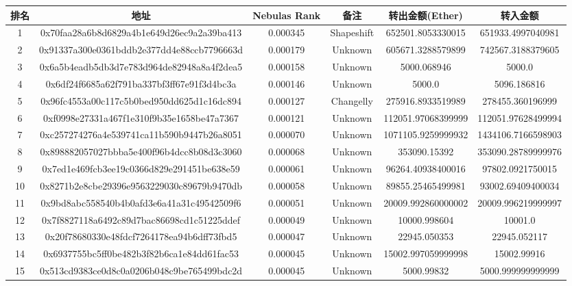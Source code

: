 \begin{table}\label{table:nr}
\begin{tabular}{cccccc}\toprule
排名 & 地址                                         & Nebulas Rank & 备注         & 转出金额(Ether)               & 转入金额               \\  \midrule
1  & 0x70faa28a6b8d6829a4b1e649d26ec9a2a39ba413 & 0.000345     & Shapeshift & 652501.8053330015  & 651933.4997040981  \\
2  & 0x91337a300e0361bddb2e377dd4e88ccb7796663d & 0.000179     & Unknown    & 605671.3288579899  & 742567.3188379605  \\
3  & 0x6a5b4eadb5db3d7e783d964de82948a8a4f2dea5 & 0.000158     & Unknown    & 5000.068946        & 5000.0             \\
4  & 0x6df24f6685a62f791ba337bf3ff67e91f3d4bc3a & 0.000146     & Unknown    & 5000.0             & 5096.186816        \\
5  & 0x96fc4553a00c117c5b0bed950dd625d1c16dc894 & 0.000127     & Changelly  & 275916.8933519989  & 278455.360196999   \\
6  & 0xf0998e27331a467f1e310f9b35e1658be47a7367 & 0.000121     & Unknown    & 112051.97068399999 & 112051.97628499994 \\
7  & 0xc257274276a4e539741ca11b590b9447b26a8051 & 0.000070     & Unknown    & 1071105.9259999932 & 1434106.7166598903 \\
8  & 0x898882057027bbba5e400f96b4dcc8b08d3c3060 & 0.000068     & Unknown    & 353090.15392       & 353090.28789999976 \\
9  & 0x7ed1e469fcb3ee19c0366d829e291451be638e59 & 0.000061     & Unknown    & 96264.40938400016  & 97802.0921750015   \\
10 & 0x8271b2e8cbe29396e9563229030c89679b9470db & 0.000058     & Unknown    & 89855.25465499981  & 93002.69409400034  \\
11 & 0x9bd8abc558540b4b0afd3e6a41a31c49542509f6 & 0.000051     & Unknown    & 20009.992860000002 & 20009.996219999997 \\
12 & 0x7f8827118a6492c89d7bac86698cd1c51225ddef & 0.000049     & Unknown    & 10000.998604       & 10001.0            \\
13 & 0x20f78680330e48fdcf7264178ea94b6dff73fbd5 & 0.000047     & Unknown    & 22945.050353       & 22945.052117       \\
14 & 0x6937755bc5ff0be482b3f82b6ca1e84dd61fac53 & 0.000045     & Unknown    & 15002.997059999998 & 15002.99916        \\
15 & 0x513cd9383ce0d8c0a0206b048c9be765499bdc2d & 0.000045     & Unknown    & 5000.99832         & 5000.999999999999  \\

\end{tabular}
\end{table}
